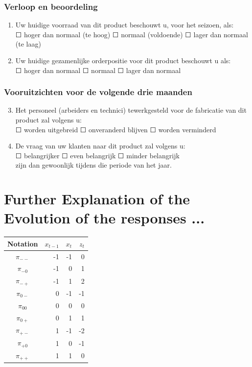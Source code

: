 \documentclass[12pt,a4paper,oneside]{book}
\begin{document}
\subsubsection*{Verloop en beoordeling}
\begin{enumerate}
    \item Uw huidige voorraad van dit product beschouwt u, voor het seizoen, als: \\
	$\Square$	hoger dan normaal (te hoog)	$\Square$	normaal (voldoende)	$\Square$ lager dan normaal (te laag)
	
    \item Uw huidige gezamenlijke orderpositie voor dit product beschouwt u als: \\
	$\Square$ hoger dan normaal $\Square$ normaal $\Square$ lager dan normaal
\end{enumerate}

\subsubsection*{Vooruitzichten voor de volgende drie maanden} 
\begin{enumerate}
\setcounter{enumi}{2}
    \item Het personeel (arbeiders en technici) tewerkgesteld voor de fabricatie van dit product zal volgens u: \\
	$\Square$ worden uitgebreid $\Square$ onveranderd blijven $\Square$ worden verminderd
						
    \item De vraag van uw klanten naar dit product zal volgens u:  \\
	$\Square$ belangrijker $\Square$ even belangrijk $\Square$ minder belangrijk \\	
	zijn dan gewoonlijk tijdens die periode van het jaar.
\end{enumerate}

\newpage
\section*{Further Explanation of the Evolution of the responses ...}
\label{sec:appendix explanations EIR}

\begin{center}
\begin{tabular}{|c|r|r|r|}
Notation    &  $x_{t-1}$ & $x_t$ & $z_t$ \\\hline
$\pi_{--}$    &  -1  & -1    & 0 \\
$\pi_{-0}$    &  -1  & 0     & 1 \\
$\pi_{-+}$    &  -1  & 1     & 2 \\
$\pi_{0-}$    &  0   & -1    & -1 \\
$\pi_{00}$    &  0   & 0     & 0 \\
$\pi_{0+}$    &  0   & 1     & 1 \\
$\pi_{+-}$    &  1   & -1    & -2 \\
$\pi_{+0}$    &  1   & 0     & -1 \\
$\pi_{++}$    &  1   & 1     & 0 \\
\end{tabular}  
\end{center}
\end{document}
